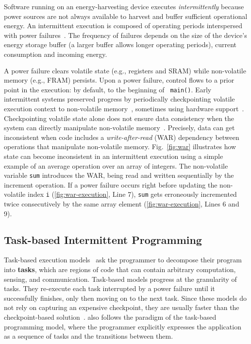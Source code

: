 Software running on an energy-harvesting device executes {\em intermittently}
because power sources are not always available to harvest and buffer
sufficient operational energy. An intermittent execution is composed of
operating periods interspersed with power
failures~\cite{dino,chain,alpaca,ratchet}.
The frequency of failures depends on the size of the device's energy storage buffer
(a larger buffer allows longer operating periods), current consumption and
incoming energy.

A power failure clears volatile state (e.g., registers and SRAM) while
non-volatile memory (e.g., FRAM) persists. Upon a power failure, control flows
to a prior point in the execution: by default, to the beginning of {\tt
main()}. Early intermittent systems preserved progress by periodically
checkpointing volatile execution context to non-volatile
memory~\cite{mementos}, sometimes using hardware
support~\cite{mottola2017harvos,hibernusplusplus,hibernus,idetic,quickrecall}. 
%
Checkpointing volatile state alone does not ensure data consistency when the
system can directly manipulate non-volatile memory~\cite{mspcdino}.
Precisely, data can get inconsistent when code includes a
\emph{write-after-read} (WAR) dependency between operations that manipulate
non-volatile memory.
Fig.~\ref{fig:war} illustrates how state can become
inconsistent in an intermittent execution using a simple example of an average
operation over an array of integers.
The non-volatile variable \texttt{sum} introduces the WAR, being read and written sequentially
by the increment operation.
If a power failure occurs right before updating the non-volatile index \texttt{i} (\ref{fig:war-execution}, Line 7), \texttt{sum} gets erroneously incremented twice consecutively by the same array element (\ref{fig:war-execution}, Lines 6 and 9).

\subsection{Task-based Intermittent Programming}
\label{section:background_task_computing}

Task-based execution models~\cite{dino,chain,alpaca} ask the programmer to
decompose their program into \textbf{tasks}, which are regions of code that can contain
arbitrary computation, sensing, and communication.  Task-based models progress at the granularity of tasks. They re-execute each task interrupted by a power failure until it successfully finishes, only then moving on to
the next task. Since these models do not rely on capturing an expensive
checkpoint, they are usually faster than the checkpoint-based
solution~\cite{chain, alpaca}.  \sys also follows the paradigm of the
task-based programming model, where the programmer explicitly expresses the
application as a sequence of tasks and the transitions between them.

